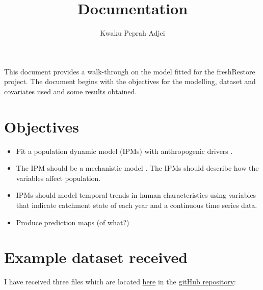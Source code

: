 \documentclass[
]{article}
\title{Documentation}
\author{Kwaku Peprah Adjei}
\date{}
\begin{document}
\maketitle
\ifdefined\Shaded\renewenvironment{Shaded}{\begin{tcolorbox}[sharp corners, boxrule=0pt, borderline west={3pt}{0pt}{shadecolor}, frame hidden, enhanced, breakable, interior hidden]}{\end{tcolorbox}}\fi

This document provides a walk-through on the model fitted for the
freshRestore project. The document begins with the objectives for the
modelling, dataset and covariates used and some results obtained.

\hypertarget{objectives}{%
\section{Objectives}\label{objectives}}

\begin{itemize}
\item
  Fit a population dynamic model (IPMs) with anthropogenic drivers
  \citep[human driven factors such as climate change, direct exploitation, pollution, biological invasions, sea-use change; ][]{moullec2021identifying}.
\item
  The IPM should be a mechanistic model
  \citep[plug and play;][]{frost2023integrated, smallegange2017mechanistic}.
  The IPMs should describe how the variables affect population.
\item
  IPMs should model temporal trends in human characteristics using
  variables that indicate catchment state of each year and a continuous
  time series data.
\item
  Produce prediction maps (of what?)
\end{itemize}

\hypertarget{example-dataset-received}{%
\section{Example dataset received}\label{example-dataset-received}}

I have received three files which are located
\href{https://github.com/Peprah94/fishyIPMs/tree/main/dataset}{here} in
the \href{https://github.com/Peprah94/fishyIPMs/tree/main}{gitHub
repository}:
\end{document}
